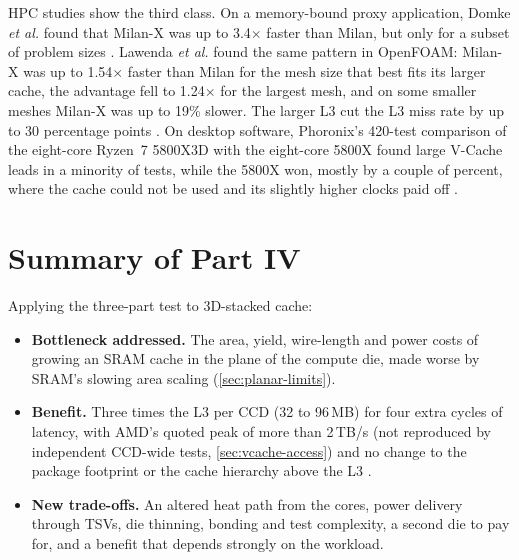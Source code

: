 

HPC studies show the third class. On a memory-bound proxy application, Domke \emph{et al.} found that Milan-X was up to 3.4$\times$ faster than Milan, but only for a subset of problem sizes \cite{domkeLocusPerformanceQuantifying2023}. Lawenda \emph{et al.} found the same pattern in OpenFOAM: Milan-X was up to 1.54$\times$ faster than Milan for the mesh size that best fits its larger cache, the advantage fell to 1.24$\times$ for the largest mesh, and on some smaller meshes Milan-X was up to 19\% slower. The larger L3 cut the L3 miss rate by up to 30 percentage points \cite{lawendaEvaluatingImpactL32025}. On desktop software, Phoronix's 420-test comparison of the eight-core Ryzen~7 5800X3D with the eight-core 5800X found large V-Cache leads in a minority of tests, while the 5800X won, mostly by a couple of percent, where the cache could not be used and its slightly higher clocks paid off \cite{larabelAMDRyzen72022}.

\section{Summary of Part IV}
Applying the three-part test to 3D-stacked cache:
\begin{itemize}
  \item \textbf{Bottleneck addressed.} The area, yield, wire-length and power costs of growing an SRAM cache in the plane of the compute die, made worse by SRAM's slowing area scaling (\cref{sec:planar-limits}).
  \item \textbf{Benefit.} Three times the L3 per CCD (32 to 96\,MB) for four extra cycles of latency, with AMD's quoted peak of more than 2\,TB/s (not reproduced by independent CCD-wide tests, \cref{sec:vcache-access}) and no change to the package footprint or the cache hierarchy above the L3 \cite{wuu2022vcache,amd2022epyc7003}.
  \item \textbf{New trade-offs.} An altered heat path from the cores, power delivery through TSVs, die thinning, bonding and test complexity, a second die to pay for, and a benefit that depends strongly on the workload.
\end{itemize}

